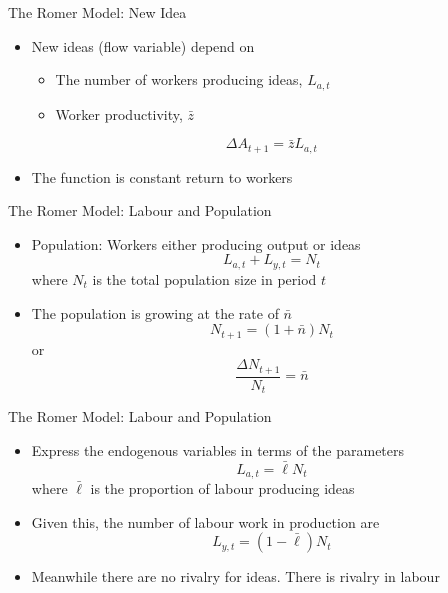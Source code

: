 \documentclass[aspectratio=1610]{beamer}
\begin{document}
\begin{frame}[wide]{The Romer Model: New Idea}
	\begin{itemize}
		\item New ideas (flow variable) depend on
		\begin{itemize}
			\item The number of workers producing ideas, $L_{a,t}$
			\item Worker productivity, $\bar{z}$
		\end{itemize}
		\vspace{1mm}
		\[\Delta A_{t+1} = \bar{z} L_{a,t}\]
		\vspace{1mm}
		\item The function is constant return to workers
		
	\end{itemize}
\end{frame}

\begin{frame}[wide]{The Romer Model: Labour and Population}
	\begin{itemize}
		\item Population: Workers either producing output or ideas
		\[L_{a,t} + L_{y,t} = N_t\]
		where $N_t$ is the total population size in period $t$
		\item 	The population is growing at the rate of $\bar{n}$
		\[N_{t+1} = (1+\bar{n}) N_t\]
		or
		\[\frac{\Delta N_{t+1}}{ N_t} = \bar{n}\]
	\end{itemize}
\end{frame}

\begin{frame}[wide]{The Romer Model: Labour and Population}
	\begin{itemize}
		\item Express the endogenous variables in terms of the parameters
		\[L_{a,t} = \bar{\ell}N_t  \]
		where $\bar{\ell}$ is the proportion of labour producing ideas
		\item Given this, the number of labour work in production are
		\[L_{y,t} = (1-\bar{\ell})N_t\]
		\item Meanwhile there are no rivalry for ideas. There is rivalry in labour 
	\end{itemize}
\end{frame}
\end{document}
